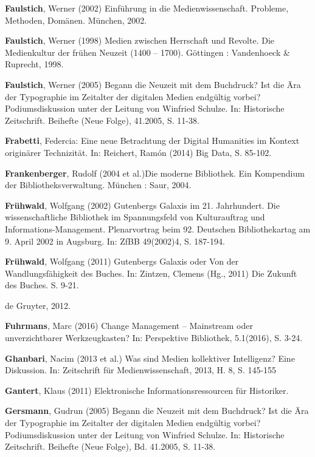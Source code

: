 \documentclass[a4paper,
fontsize=11pt,
oneside,
numbers=noperiodatend,
parskip=half-,
bibliography=totoc,
final
]{scrartcl}
\providecommand{\tightlist}{%
  \setlength{\itemsep}{0pt}\setlength{\parskip}{0pt}}
\begin{document}
\textbf{Faulstich}, Werner (2002) Einführung in die Medienwissenschaft.
Probleme, Methoden, Domänen. München, 2002.

\textbf{Faulstich}, Werner (1998) Medien zwischen Herrschaft und
Revolte. Die Medienkultur der frühen Neuzeit (1400 -- 1700). Göttingen :
Vandenhoeck \& Ruprecht, 1998.

\textbf{Faulstich}, Werner (2005) Begann die Neuzeit mit dem Buchdruck?
Ist die Ära der Typographie im Zeitalter der digitalen Medien endgültig
vorbei? Podiumsdiskussion unter der Leitung von Winfried Schulze. In:
Historische Zeitschrift. Beihefte (Neue Folge), 41.2005, S. 11-38.

\textbf{Frabetti}, Federcia: Eine neue Betrachtung der Digital
Humanities im Kontext originärer Technizität. In: Reichert, Ramón (2014)
Big Data, S. 85-102.

\textbf{Frankenberger}, Rudolf (2004 et al.)Die moderne Bibliothek. Ein
Kompendium der Bibliotheksverwaltung. München : Saur, 2004.

\textbf{Frühwald}, Wolfgang (2002) Gutenbergs Galaxis im 21.
Jahrhundert. Die wissenschaftliche Bibliothek im Spannungsfeld von
Kulturauftrag und Informations-Management. Plenarvortrag beim 92.
Deutschen Bibliothekartag am 9. April 2002 in Augsburg. In: ZfBB
49(2002)4, S. 187-194.

\textbf{Frühwald}, Wolfgang (2011) Gutenbergs Galaxis oder Von der
Wandlungsfähigkeit des Buches. In: Zintzen, Clemens (Hg., 2011) Die
Zukunft des Buches. S. 9-21.

\begin{description}
\tightlist
\item[\textbf{Füssel}, Stephan (Hg.) Medienkonvergenz --
transdisziplinär. Berlin]
de Gruyter, 2012.
\end{description}

\textbf{Fuhrmans}, Marc (2016) Change Management -- Mainstream oder
unverzichtbarer Werkzeugkasten? In: Perspektive Bibliothek, 5.1(2016),
S. 3-24.

\textbf{Ghanbari}, Nacim (2013 et al.) Was sind Medien kollektiver
Intelligenz? Eine Diskussion. In: Zeitschrift für Medienwissenschaft,
2013, H. 8, S. 145-155

\textbf{Gantert}, Klaus (2011) Elektronische Informationsressourcen für
Historiker.

\textbf{Gersmann}, Gudrun (2005) Begann die Neuzeit mit dem Buchdruck?
Ist die Ära der Typographie im Zeitalter der digitalen Medien endgültig
vorbei? Podiumsdiskussion unter der Leitung von Winfried Schulze. In:
Historische Zeitschrift. Beihefte (Neue Folge), Bd. 41.2005, S. 11-38.
\end{document}
